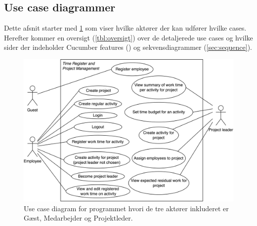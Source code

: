 \subsection{Use case diagrammer}
Dette afsnit starter med \cref{fig:AlleActorsPaaEnGang} som viser hvilke aktører der kan udfører hvilke cases. Herefter kommer en oversigt (\cref{tbl:oversigt}) over de detaljerede use cases og hvilke sider der indeholder Cucumber features () og sekvensdiagrammer (\cref{sec:sequence}).
\begin{figure}[H]
    \centering
    \caption{Use case diagram for programmet hvori de tre aktører inkluderet er Gæst, Medarbejder og Projektleder.}\label{fig:AlleActorsPaaEnGang}
    \includegraphics[width=.85\textwidth]{Diagrams/Timeregistrering og projektstyring.png}
\end{figure}
